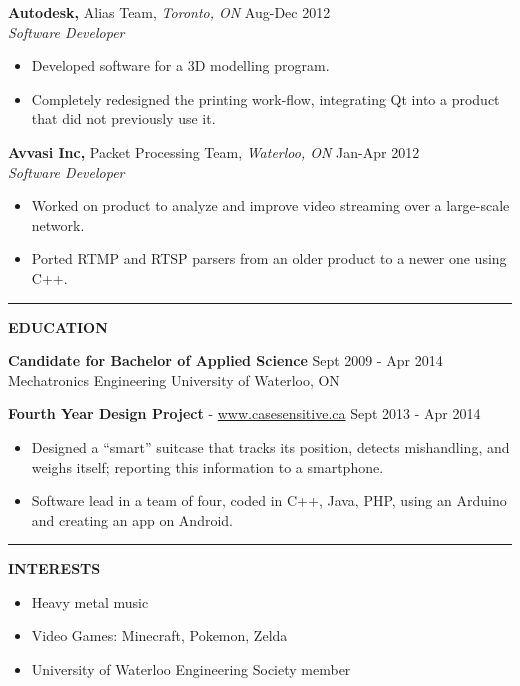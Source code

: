 \documentclass{letter}
\begin{document}
{\bf Autodesk,} Alias Team, {\sl Toronto, ON} \hfill Aug-Dec 2012 \\
{\sl Software Developer}
\begin{itemize}
  \item Developed software for a 3D modelling program.
  \item Completely redesigned the printing work-flow, integrating Qt into a product that did not previously use it.
\end{itemize}

{\bf Avvasi Inc,} Packet Processing Team, {\sl Waterloo, ON} \hfill Jan-Apr 2012 \\
{\sl Software Developer}
\begin{itemize}
  \item Worked on product to analyze and improve video streaming over a large-scale network.
  \item Ported RTMP and RTSP parsers from an older product to a newer one using C++.
\end{itemize}

\vskip 2pt
\hrule
{\large\bf EDUCATION}

{\bf Candidate for Bachelor of Applied Science} \hfill Sept 2009 - Apr 2014 \\
Mechatronics Engineering \hfill University of Waterloo, ON

{\bf Fourth Year Design Project} - \href{http://www.casesensitive.ca}{www.casesensitive.ca} \hfill Sept 2013 - Apr 2014
\begin{itemize}
  \item Designed a ``smart'' suitcase that tracks its position, detects mishandling, and weighs itself; reporting this information to a smartphone.
  \item Software lead in a team of four, coded in C++, Java, PHP, using an Arduino and creating an app on Android.
\end{itemize}

\vskip 2pt
\hrule
{\large\bf INTERESTS}
\begin{itemize}
  \item Heavy metal music
  \item Video Games: Minecraft, Pokemon, Zelda
  \item University of Waterloo Engineering Society member
\end{itemize}
\end{document}
